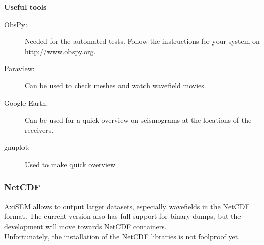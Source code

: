 \documentclass{article}
\begin{document}
\textbf{Useful tools}

\begin{description}
    \item[ObsPy:] Needed for the automated tests. Follow the instructions for your system
          on \url{http://www.obspy.org}.
    \item[Paraview:] Can be used to check meshes and watch wavefield movies.
    \item[Google Earth:] Can be used for a quick overview on seismograms at the locations
          of the receivers.
    \item[gnuplot:] Used to make quick overview
\end{description}


\subsubsection{NetCDF}

AxiSEM allows to output larger datasets, especially wavefields in the NetCDF format. The
current version also has full support for binary dumps, but the development will move
towards NetCDF containers.\\
Unfortunately, the installation of the NetCDF libraries is not foolproof yet.
\end{document}
